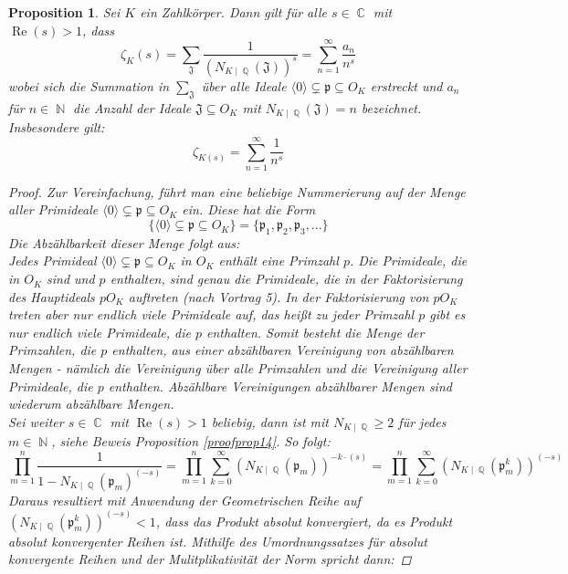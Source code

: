 \documentclass[10pt,a4paper]{article}
\theoremstyle{plain}
\newtheorem{prop}[thm]{Proposition}
\theoremstyle{definition}
\theoremstyle{remark}
\DeclareMathOperator{\C}{\mathbb{C}}
\DeclareMathOperator{\Q}{\mathbb{Q}}
\DeclareMathOperator{\N}{\mathbb{N}}
\DeclareMathOperator{\re}{Re}
\begin{document}
\begin{prop}

Sei $\textit{K}$ ein Zahlkörper. Dann gilt für alle $s \in \C $ mit $ \re(s)>1$, dass$$\zeta_{K}(s) = \sum_{\mathfrak{J}}\frac{1}{(N_{K\mid\Q}(\mathfrak{J}))^s}=\sum_{n=1}^{\infty}\frac{a_n}{n^s}$$
wobei sich die Summation in $\sum_{\mathfrak{J}}$ über alle Ideale $\langle0\rangle\subsetneq \mathfrak{p} \subseteq O_{\textit{K}}$ erstreckt und $a_n$ für $n \in \N$ die Anzahl der Ideale $\mathfrak{J} \subseteq O_K$ mit $N_{K\mid \Q}(\mathfrak{J}) = n$ bezeichnet. Insbesondere gilt: $$\zeta_{K(s)}= \sum_{n=1}^{\infty}\frac{1}{n^s}$$

\begin{proof}

Zur Vereinfachung, führt man eine beliebige Nummerierung auf der Menge aller Primideale $\langle0\rangle\subsetneq \mathfrak{p} \subseteq O_{\textit{K}}$ ein. Diese hat die Form $$\{\langle0\rangle\subsetneq \mathfrak{p} \subseteq O_{\textit{K}}\}=\{\mathfrak{p}_1,\mathfrak{p}_2,\mathfrak{p}_3,...\}$$Die Abzählbarkeit dieser Menge folgt aus: 
\\
Jedes Primideal $\langle0\rangle\subsetneq \mathfrak{p} \subseteq O_{K}$ in $O_K$ enthält eine Primzahl $p$. Die Primideale, die in $O_K$ sind und $p$ enthalten, sind genau die Primideale, die in der Faktorisierung des Hauptideals $pO_K$ auftreten (nach Vortrag 5). In der Faktorisierung von $pO_K$ treten aber nur endlich viele Primideale auf, das heißt zu jeder Primzahl $p$ gibt es nur endlich viele Primideale, die $p$ enthalten. Somit besteht die Menge der Primzahlen, die $p$ enthalten, aus einer abzählbaren Vereinigung von abzählbaren Mengen - nämlich die Vereinigung über alle Primzahlen und die Vereinigung aller Primideale, die $p$ enthalten. Abzählbare Vereinigungen abzählbarer Mengen sind wiederum abzählbare Mengen.
\\
Sei weiter $s \in \C $ mit $ \re(s) > 1$ beliebig, dann ist mit $N_{K\mid \Q}\geq 2$ für jedes $m \in \N$,  siehe Beweis Proposition \ref{proofprop14}. So folgt:$$\prod_{m=1}^{n}\frac{1}{1-N_{K\mid \Q}(\mathfrak{p}_m)^{(-s)}} =\prod_{m=1}^{n}\sum_{k=0}^{\infty}(N_{K\mid \Q}(\mathfrak{p}_m))^{-k\cdot(s)}=\prod_{m=1}^{n}\sum_{k=0}^{\infty}(N_{K\mid \Q}(\mathfrak{p}_m^k))^{(-s)}$$
Daraus resultiert mit Anwendung der Geometrischen Reihe auf \\
$(N_{K\mid \Q}(\mathfrak{p}_m^k))^{(-s)} < 1$, dass das Produkt absolut konvergiert, da es Produkt absolut konvergenter Reihen ist. Mithilfe des Umordnungssatzes für absolut konvergente Reihen und der Mulitplikativität der Norm spricht dann:

\end{proof}
\end{prop}
\end{document}
